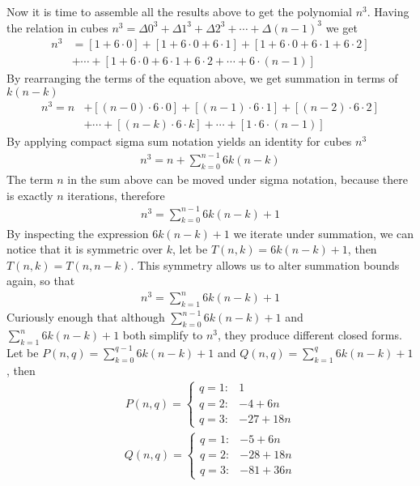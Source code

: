 Now it is time to assemble all the results above to get the polynomial $n^3$.
Having the relation in cubes $n^3 = \Delta 0^3 + \Delta 1^3 + \Delta 2^3 + \cdots + \Delta (n-1)^3$
we get
\begin{align*}
    n^3 &= [1+6\cdot0]+[1+6\cdot0+6\cdot1]+[1+6\cdot0+6\cdot1+6\cdot2] \nonumber \\
    &+ \cdots + [1+6\cdot0+6\cdot1+6\cdot2+\cdots+6\cdot(n-1)]
\end{align*}
By rearranging the terms of the equation above, we get summation in terms of $k (n-k)$
\begin{align}
    \label{eq:rearranged-cubes}
    n^3 = n &+ [(n-0) \cdot 6 \cdot 0] + [(n-1)\cdot6\cdot1] + [(n-2)\cdot6\cdot2] \nonumber \\
    &+ \cdots + [(n-k)\cdot 6 \cdot k] + \cdots + [1\cdot6\cdot(n-1)]
\end{align}
By applying compact sigma sum notation yields an identity for cubes $n^3$
\begin{align*}
    n^3 = n + \sum_{k=0}^{n-1} 6k(n-k)
\end{align*}
The term $n$ in the sum above can be moved under sigma notation, because there is exactly $n$ iterations, therefore
\begin{align*}
    n^3 = \sum_{k=0}^{n-1} 6k(n-k) + 1
\end{align*}
By inspecting the expression $6k(n-k) + 1$ we iterate under summation,
we can notice that it is symmetric over $k$, let be $T(n,k) = 6k(n-k) + 1$, then $T(n,k) = T(n,n-k)$.
This symmetry allows us to alter summation bounds again, so that
\begin{align*}
    n^3 = \sum_{k=1}^{n} 6k(n-k) + 1
\end{align*}
Curiously enough that although $\sum_{k=0}^{n-1} 6k(n-k) + 1$ and $\sum_{k=1}^{n} 6k(n-k) + 1$ both simplify to $n^3$,
they produce different closed forms.
Let be $P(n, q) = \sum_{k=0}^{q-1} 6k(n-k) + 1$ and $Q(n, q) = \sum_{k=1}^{q} 6k(n-k) + 1$, then
\begin{align*}
    P(n, q) =
    \begin{cases}
        q = 1: & 1 \\
        q = 2: & -4 + 6 n \\
        q = 3: & -27 + 18 n
    \end{cases}
\end{align*}
\begin{align*}
    Q(n, q) =
    \begin{cases}
        q = 1: & -5 + 6 n \\
        q = 2: & -28 + 18 n \\
        q = 3: & -81 + 36 n
    \end{cases}
\end{align*}
